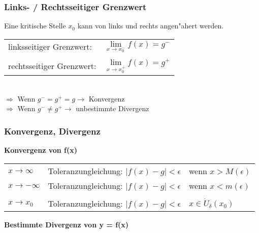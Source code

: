 \subsubsection{Links- / Rechtsseitiger Grenzwert}
    Eine kritische Stelle $x_0$ 	kann von links und rechts angen"ahert werden. \\
        
    \begin{tabular}{ll}
        linksseitiger Grenzwert: & $\lim\limits_{x \to x_0^-} f(x) = g^-$ \\
        \\
        rechtsseitiger Grenzwert: & $\lim\limits_{x \to x_0^+} f(x) = g^+$ \\
    \end{tabular}
    \\ 
    $\Rightarrow$ Wenn $g^- = g^+ = g \rightarrow$ Konvergenz  \\
    $\Rightarrow$ Wenn $g^- \neq g^+ \rightarrow$ unbestimmte Divergenz \\

\subsubsection{Konvergenz, Divergenz}	
    \textbf{Konvergenz von f(x)} \\

        \begin{tabular}{lll}
            $x \rightarrow \infty$  & Toleranzungleichung: $\vert f(x) - g \vert < \epsilon$ & wenn $x > M(\epsilon)$ \\
            $x \rightarrow -\infty$ & Toleranzungleichung: $\vert f(x) - g \vert < \epsilon$ & wenn $x < m(\epsilon)$ \\
            \\
            $x \rightarrow x_0$     & Toleranzungleichung:  $\vert f(x) - g \vert < \epsilon$ & $ x \in \dot{U}_\delta(x_0)$ \\
        \end{tabular}
    
    \textbf{Bestimmte Divergenz von y = f(x)} \\

